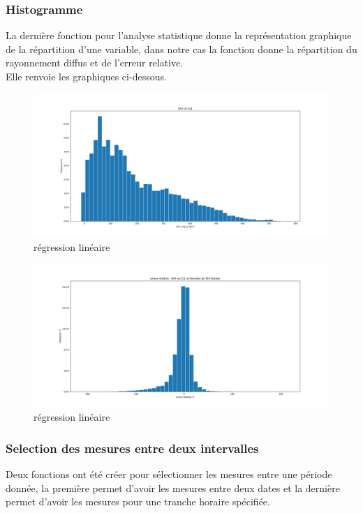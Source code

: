 \documentclass[12pt,a4paper]{article}
\begin{document}
\begin{flushleft}
\subsubsection{Histogramme}

La dernière fonction pour l'analyse statistique donne la représentation graphique de la répartition d'une variable, dans notre cas la fonction donne la répartition du rayonnement diffus et de l'erreur relative.\\
Elle renvoie les graphiques ci-dessous.
\begin{figure}[H]
\centering
\includegraphics[width=15cm]{image/histogramme/1.png} 
\caption{régression linéaire}  
\end{figure}

\begin{figure}[H]
\centering
\includegraphics[width=15cm]{image/histogramme/2.png}  
\caption{régression linéaire}  
\end{figure}

\subsubsection{Selection des mesures entre deux intervalles}

Deux fonctions ont été créer pour sélectionner les mesures entre une période donnée, la première permet d'avoir les mesures entre deux dates et la dernière permet d'avoir les mesures pour une tranche horaire spécifiée.


\end{flushleft}
\end{document}
